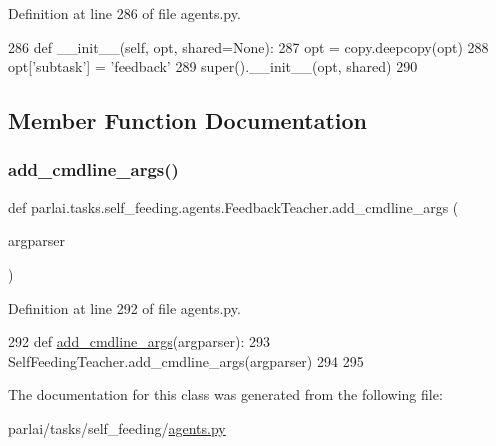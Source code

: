 Definition at line 286 of file agents.\+py.


\begin{DoxyCode}
286     \textcolor{keyword}{def }\_\_init\_\_(self, opt, shared=None):
287         opt = copy.deepcopy(opt)
288         opt[\textcolor{stringliteral}{'subtask'}] = \textcolor{stringliteral}{'feedback'}
289         super().\_\_init\_\_(opt, shared)
290 
\end{DoxyCode}


\subsection{Member Function Documentation}
\mbox{\label{classparlai_1_1tasks_1_1self__feeding_1_1agents_1_1FeedbackTeacher_ad574b840424ec2d7096639c198af08c7}} 
\subsubsection{\texorpdfstring{add\+\_\+cmdline\+\_\+args()}{add\_cmdline\_args()}}
{\footnotesize\ttfamily def parlai.\+tasks.\+self\+\_\+feeding.\+agents.\+Feedback\+Teacher.\+add\+\_\+cmdline\+\_\+args (\begin{DoxyParamCaption}\item[{}]{argparser }\end{DoxyParamCaption})\hspace{0.3cm}{\ttfamily [static]}}



Definition at line 292 of file agents.\+py.


\begin{DoxyCode}
292     \textcolor{keyword}{def }\hyperlink{namespaceparlai_1_1agents_1_1drqa_1_1config_a62fdd5554f1da6be0cba185271058320}{add\_cmdline\_args}(argparser):
293         SelfFeedingTeacher.add\_cmdline\_args(argparser)
294 
295 
\end{DoxyCode}


The documentation for this class was generated from the following file\+:\begin{DoxyCompactItemize}
\item 
parlai/tasks/self\+\_\+feeding/\hyperlink{parlai_2tasks_2self__feeding_2agents_8py}{agents.\+py}\end{DoxyCompactItemize}

